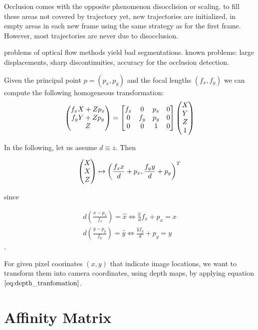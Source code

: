 Occlusion comes with the opposite phenomenon disocclision or scaling. to fill these areas not covered by trajectory yet, new trajectories are initialized, in empty areas in each new frame using the same strategy as for the first frame.
However, most trajectories are never due to disocclusion.


problems of optical flow methods yield bad segmentations. known problems: large displacements, sharp discontinuities, accuracy for the occlusion detection.


Given the principal point $p = \left(p_x, p_y \right)$ and the focal lengths $\left(f_x, f_y \right)$ we can compute the following homogeneous transformation:
\begin{equation}
\colvec[f_x X + Z p_x]{f_y Y + Z p_y}{Z} =
\begin{bmatrix}
f_x & 0 & p_x & 0 \\
0 & f_y & p_y & 0 \\
0 & 0 & 1 & 0
\end{bmatrix}
\begin{pmatrix}
X \\
Y \\
Z \\
1
\end{pmatrix}
\end{equation}

In the following, let us assume $d \equiv z$. Then

\begin{equation}
	\colvec[X]{X}{Z} \mapsto \left( \frac{f_x x}{d} + p_x, \frac{f_y y}{d} + p_y \right)^T
\end{equation}

since

\begin{equation}
\begin{aligned}
	d \left( \frac{x - p_x}{f_x} \right) = \hat{x} \Leftrightarrow \frac{\hat{x}}{d} f_x + p_x = x \\
	d \left( \frac{y - p_y}{f_y} \right) = \hat{y} \Leftrightarrow \frac{\hat{y} f_y}{d} + p_y = y 
\end{aligned}
\label{eq:depth_tranfomation}
\end{equation}.

For given pixel coorinates $\left( x,y \right)$ that indicate image locations, we want to transform them into camera coordinates, using depth maps, by applying equation $\ref{eq:depth_tranfomation}$.



\section{Affinity Matrix}



